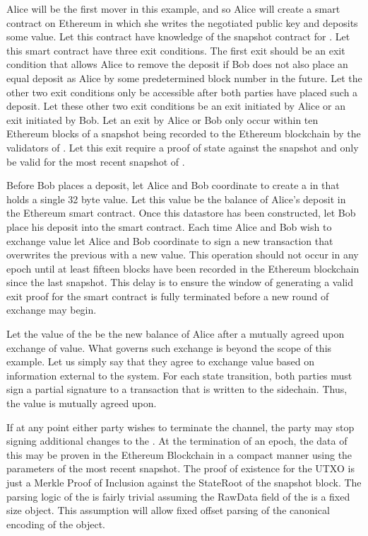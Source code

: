 Alice will be the first mover in this example, and so Alice will create
a smart contract on Ethereum in which she writes the negotiated public
key and deposits some value.
Let this contract have knowledge of the snapshot contract for
\LayerTwoLong{}.
Let this smart contract have three exit conditions.
The first exit should be an exit condition that allows Alice to remove
the deposit if Bob does not also place an equal deposit as Alice by
some predetermined block number in the future.
Let the other two exit conditions only be accessible after both parties
have placed such a deposit.
Let these other two exit conditions be an exit initiated by Alice or an
exit initiated by Bob.
Let an exit by Alice or Bob only occur within ten Ethereum blocks of a
snapshot being recorded to the Ethereum blockchain by the validators of
\LayerTwoLong{}.
Let this exit require a proof of state against the snapshot and only be
valid for the most recent snapshot of \LayerTwoLong{}.

Before Bob places a deposit, let Alice and Bob coordinate to create a
\DataStore{} in \LayerTwoLong{} that holds a single 32 byte value.
Let this value be the balance of Alice’s deposit in the Ethereum
smart contract.
Once this datastore has been constructed, let Bob place his deposit
into the smart contract.
Each time Alice and Bob wish to exchange value let Alice and Bob
coordinate to sign a new transaction that overwrites the previous
\DataStore{} with a new value.
This operation should not occur in any epoch until at least fifteen
blocks have been recorded in the Ethereum blockchain since the last
snapshot.
This delay is to ensure the window of generating a valid exit proof for
the smart contract is fully terminated before a new round of exchange
may begin.

Let the value of the \DataStore{} be the new balance of Alice after a
mutually agreed upon exchange of value.
What governs such exchange is beyond the scope of this example.
Let us simply say that they agree to exchange value based on
information external to the system.
For each state transition, both parties must sign a partial signature
to a transaction that is written to the sidechain.
Thus, the value is mutually agreed upon.

If at any point either party wishes to terminate the channel, the party
may stop signing additional changes to the \DataStore{}.
At the termination of an epoch, the data of this \DataStore{} may be
proven in the Ethereum Blockchain in a compact manner using the
parameters of the most recent snapshot.
The proof of existence for the \DataStore{} UTXO is just a Merkle Proof of
Inclusion against the StateRoot of the snapshot block.
The parsing logic of the \DataStore{} is fairly trivial assuming the
RawData field of the \DataStore{} is a fixed size object.
This assumption will allow fixed offset parsing of the canonical
encoding of the \DataStore{} object.

